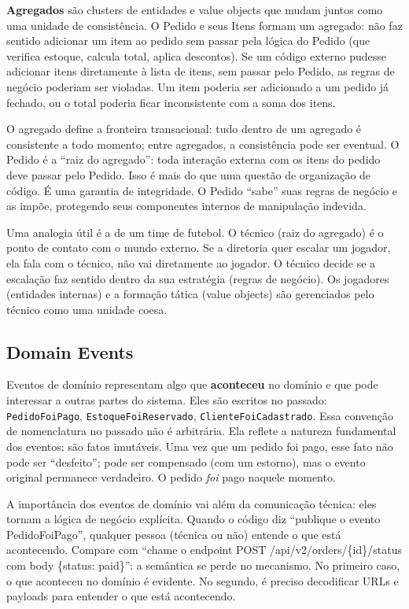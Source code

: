 \textbf{Agregados} são clusters de entidades e value objects que mudam juntos
como uma unidade de consistência. O Pedido e seus Itens formam um agregado: não
faz sentido adicionar um item ao pedido sem passar pela lógica do Pedido (que
verifica estoque, calcula total, aplica descontos). Se um código externo pudesse
adicionar itens diretamente à lista de itens, sem passar pelo Pedido, as regras
de negócio poderiam ser violadas. Um item poderia ser adicionado a um pedido
já fechado, ou o total poderia ficar inconsistente com a soma dos itens.

O agregado define a fronteira transacional: tudo dentro de um agregado é
consistente a todo momento; entre agregados, a consistência pode ser eventual.
O Pedido é a ``raiz do agregado'': toda interação externa com os itens do
pedido deve passar pelo Pedido. Isso é mais do que uma questão de organização
de código. É uma garantia de integridade. O Pedido ``sabe'' suas regras de
negócio e as impõe, protegendo seus componentes internos de manipulação
indevida.

Uma analogia útil é a de um time de futebol. O técnico (raiz do agregado) é o
ponto de contato com o mundo externo. Se a diretoria quer escalar um jogador,
ela fala com o técnico, não vai diretamente ao jogador. O técnico decide se a
escalação faz sentido dentro da sua estratégia (regras de negócio). Os jogadores
(entidades internas) e a formação tática (value objects) são gerenciados pelo
técnico como uma unidade coesa.

\subsection{Domain Events}

Eventos de domínio representam algo que \textbf{aconteceu} no domínio e que
pode interessar a outras partes do sistema. Eles são escritos no passado:
\texttt{PedidoFoiPago}, \texttt{EstoqueFoiReservado}, \texttt{ClienteFoiCadastrado}.
Essa convenção de nomenclatura no passado não é arbitrária. Ela reflete a
natureza fundamental dos eventos: são fatos imutáveis. Uma vez que um pedido
foi pago, esse fato não pode ser ``desfeito''; pode ser compensado (com um
estorno), mas o evento original permanece verdadeiro. O pedido \textit{foi} pago
naquele momento.

A importância dos eventos de domínio vai além da comunicação técnica: eles tornam
a lógica de negócio explícita. Quando o código diz ``publique o evento
PedidoFoiPago'', qualquer pessoa (técnica ou não) entende o que está
acontecendo. Compare com ``chame o endpoint POST /api/v2/orders/\{id\}/status com
body \{status: paid\}'': a semântica se perde no mecanismo. No primeiro caso,
o que aconteceu no domínio é evidente. No segundo, é preciso decodificar URLs e
payloads para entender o que está acontecendo.

